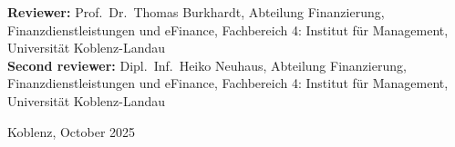\begin{titlepage}
\begin{minipage}[b]{0.9\textwidth}
\begin{flushleft}

  \footnotesize{
      {\bf Reviewer:}   %
	  	Prof.\ Dr.\ Thomas Burkhardt, Abteilung Finanzierung,
	  	Finanzdienstleistungen und eFinance, Fachbereich 4: Institut f\"ur
	  	Management, Universit\"at Koblenz-Landau\\
      {\bf Second reviewer:} Dipl.\ Inf.\ Heiko Neuhaus, Abteilung Finanzierung,
      Finanzdienstleistungen und eFinance, Fachbereich 4: Institut f\"ur
      Management, Universit\"at Koblenz-Landau\\
    
    \vspace{1em}
    \begin{flushleft}
    Koblenz, October 2025
    \end{flushleft}
 }

  \end{flushleft}
\end{minipage}

\end{titlepage}
